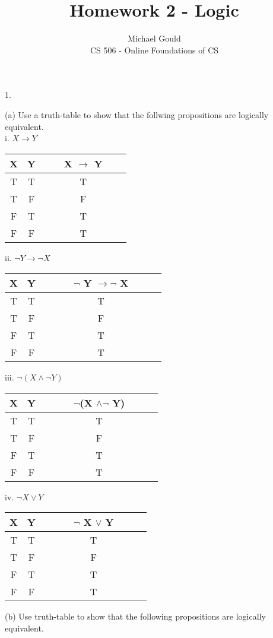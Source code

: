 \documentclass[10pt]{article}
\begin{document}
\title{Homework 2 - Logic}
\author{Michael Gould\\ 
CS 506 - Online Foundations of CS}
 
\maketitle

1.

(a) Use a truth-table to show that the follwing propositions are logically equivalent.\\ 

i. $X \rightarrow Y$

\center
\begin{tabular}{@{ }c@{ }@{ }c | c@{ }@{ }c@{ }@{ }c@{ }@{ }c@{ }@{ }c}
X & Y &  & & X $\rightarrow$ Y & & \\
\hline 
T & T &  &  & T\\
T & F &  &  & F\\
F & T &  &  & T\\
F & F &  &  & T\\
\end{tabular}
\flushleft

ii. $ \neg Y \rightarrow \neg X$
\center
\begin{tabular}{@{ }c@{ }@{ }c | c@{ }@{ }c@{ }@{ }c@{ }@{ }c@{ }@{ }c@{ }@{ }c@{ }@{ }c}
X & Y &  &  & & $\neg$ Y $\rightarrow \neg$ X & & & \\
\hline 
T & T &  &  &  & T\\
T & F &  &  &  & F\\
F & T &  &  &  & T\\
F & F &  &  &  & T\\
\end{tabular}

\flushleft
iii. $\neg (X \wedge \neg Y)$
\center
\begin{tabular}{@{ }c@{ }@{ }c | c@{ }@{ }c@{ }@{ }c@{ }@{ }c@{ }@{ }c@{ }@{ }c@{ }@{ }c}
X & Y & & & & $\neg$(X $\wedge \neg$ Y) &  & \\
\hline 
T & T &  &  &  & T\\
T & F &  &  &  & F\\
F & T &  &  &  & T\\
F & F &  &  &  & T\\
\end{tabular}
\flushleft

iv. $\neg X \vee Y$
\center
\begin{tabular}{@{ }c@{ }@{ }c | c@{ }@{ }c@{ }@{ }c@{ }@{ }c@{ }@{ }c@{ }@{ }c@{ }@{ }c}
X & Y &  &  & & $\neg$ X $\vee$ Y &  & \\
\hline 
T & T &  &  &  & T\\
T & F &  &  &  & F\\
F & T &  &  &  & T\\
F & F &  &  &  & T\\
\end{tabular}
\flushleft
(b) Use truth-table to show that the following propositions are logically equivalent.\\
\end{document}
